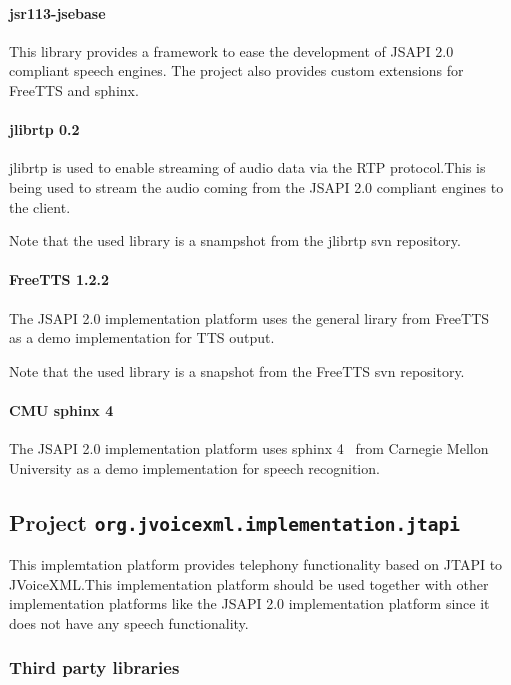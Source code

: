 \documentclass[11pt,a4paper]{article}
\begin{document}
\paragraph{jsr113-jsebase}

This library provides a framework to ease the development of JSAPI 2.0
compliant speech engines. The project also provides custom extensions for
FreeTTS and sphinx.

\paragraph{jlibrtp 0.2}

jlibrtp is used to enable streaming of audio data via the RTP protocol.This
is being used to stream the audio coming from the JSAPI 2.0 compliant
engines to the client.

Note that the used library is a snampshot from the jlibrtp svn repository.

\paragraph{FreeTTS 1.2.2}

The JSAPI 2.0 implementation platform uses the general lirary from
FreeTTS~\cite{freetts} as a demo implementation for TTS output.

Note that the used library is a snapshot from the FreeTTS svn repository.

\paragraph{CMU sphinx 4}
\label{sec:sphinx}

The JSAPI 2.0 implementation platform uses sphinx 4~\cite{sphinx} from
Carnegie Mellon University as a demo implementation for speech recognition.

\subsection{Project \lstinline{org.jvoicexml.implementation.jtapi}}

This implemtation platform provides telephony functionality based on JTAPI to
JVoiceXML.This implementation platform should be used together with other
implementation platforms like the JSAPI 2.0 implementation platform since it
does not have any speech functionality.


\subsubsection{Third party libraries}
\label{sec:jtapi-third-party-libr}
\end{document}
